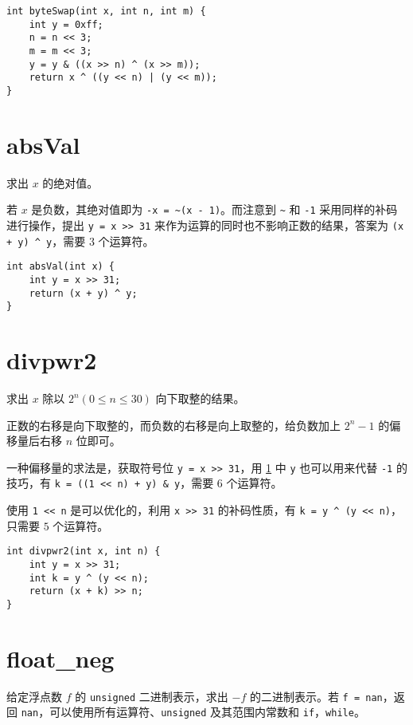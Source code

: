 \documentclass{noithesis}
\begin{document}
\begin{lstlisting}
int byteSwap(int x, int n, int m) {
	int y = 0xff;
	n = n << 3;
	m = m << 3;
	y = y & ((x >> n) ^ (x >> m));
	return x ^ ((y << n) | (y << m));
}
\end{lstlisting}

	\section{absVal}
	\label{absVal}
	
	求出 $x$ 的绝对值。
	
	若 $x$ 是负数，其绝对值即为 \verb|-x = ~(x - 1)|。而注意到 \verb|~| 和 \verb|-1| 采用同样的补码进行操作，提出 \verb|y = x >> 31| 来作为运算的同时也不影响正数的结果，答案为 \verb|(x + y) ^ y|，需要 $3$ 个运算符。
	
\begin{lstlisting}
int absVal(int x) {
	int y = x >> 31;
	return (x + y) ^ y;
}
\end{lstlisting}
	
	\section{divpwr2}
	
	求出 $x$ 除以 $2^n(0\leq n\leq 30)$ 向下取整的结果。
	
	正数的右移是向下取整的，而负数的右移是向上取整的，给负数加上 $2^n-1$ 的偏移量后右移 $n$ 位即可。
	
	一种偏移量的求法是，获取符号位 \verb|y = x >> 31|，用 \ref{absVal} 中 \verb|y| 也可以用来代替 \verb|-1| 的技巧，有 \verb|k = ((1 << n) + y) & y|，需要 $6$ 个运算符。
	
	使用 \verb|1 << n| 是可以优化的，利用 \verb|x >> 31| 的补码性质，有 \verb|k = y ^ (y << n)|，只需要 $5$ 个运算符。
	
\begin{lstlisting}
int divpwr2(int x, int n) {
	int y = x >> 31;
	int k = y ^ (y << n);
	return (x + k) >> n;
}
\end{lstlisting}

	\section{float\_neg}
	
	给定浮点数 $f$ 的 \verb|unsigned| 二进制表示，求出 $-f$ 的二进制表示。若 \verb|f = nan|，返回 \verb|nan|，可以使用所有运算符、\verb|unsigned| 及其范围内常数和 \verb|if|，\verb|while|。
	
\end{document}
